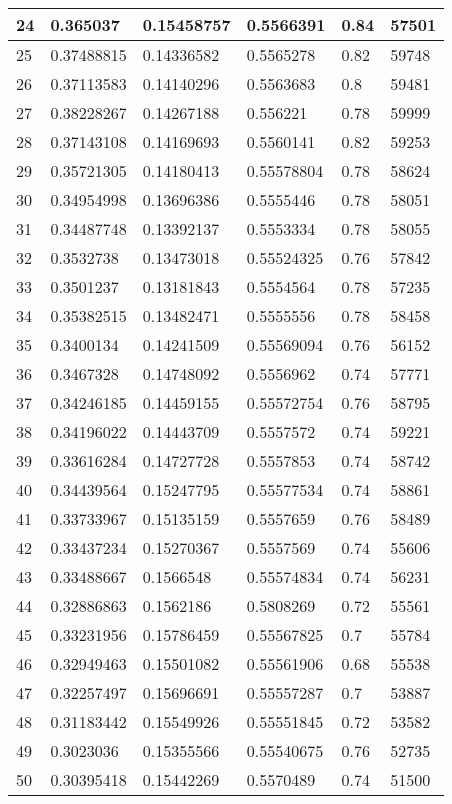 \begin{longtable}{|l|l|l|l|l|l|}
24 & 0.365037 & 0.15458757 & 0.5566391 & 0.84 & 57501 \\ \hline 
25 & 0.37488815 & 0.14336582 & 0.5565278 & 0.82 & 59748 \\ \hline 
26 & 0.37113583 & 0.14140296 & 0.5563683 & 0.8 & 59481 \\ \hline 
27 & 0.38228267 & 0.14267188 & 0.556221 & 0.78 & 59999 \\ \hline 
28 & 0.37143108 & 0.14169693 & 0.5560141 & 0.82 & 59253 \\ \hline 
29 & 0.35721305 & 0.14180413 & 0.55578804 & 0.78 & 58624 \\ \hline 
30 & 0.34954998 & 0.13696386 & 0.5555446 & 0.78 & 58051 \\ \hline 
31 & 0.34487748 & 0.13392137 & 0.5553334 & 0.78 & 58055 \\ \hline 
32 & 0.3532738 & 0.13473018 & 0.55524325 & 0.76 & 57842 \\ \hline 
33 & 0.3501237 & 0.13181843 & 0.5554564 & 0.78 & 57235 \\ \hline 
34 & 0.35382515 & 0.13482471 & 0.5555556 & 0.78 & 58458 \\ \hline 
35 & 0.3400134 & 0.14241509 & 0.55569094 & 0.76 & 56152 \\ \hline 
36 & 0.3467328 & 0.14748092 & 0.5556962 & 0.74 & 57771 \\ \hline 
37 & 0.34246185 & 0.14459155 & 0.55572754 & 0.76 & 58795 \\ \hline 
38 & 0.34196022 & 0.14443709 & 0.5557572 & 0.74 & 59221 \\ \hline 
39 & 0.33616284 & 0.14727728 & 0.5557853 & 0.74 & 58742 \\ \hline 
40 & 0.34439564 & 0.15247795 & 0.55577534 & 0.74 & 58861 \\ \hline 
41 & 0.33733967 & 0.15135159 & 0.5557659 & 0.76 & 58489 \\ \hline 
42 & 0.33437234 & 0.15270367 & 0.5557569 & 0.74 & 55606 \\ \hline 
43 & 0.33488667 & 0.1566548 & 0.55574834 & 0.74 & 56231 \\ \hline 
44 & 0.32886863 & 0.1562186 & 0.5808269 & 0.72 & 55561 \\ \hline 
45 & 0.33231956 & 0.15786459 & 0.55567825 & 0.7 & 55784 \\ \hline 
46 & 0.32949463 & 0.15501082 & 0.55561906 & 0.68 & 55538 \\ \hline 
47 & 0.32257497 & 0.15696691 & 0.55557287 & 0.7 & 53887 \\ \hline 
48 & 0.31183442 & 0.15549926 & 0.55551845 & 0.72 & 53582 \\ \hline 
49 & 0.3023036 & 0.15355566 & 0.55540675 & 0.76 & 52735 \\ \hline 
50 & 0.30395418 & 0.15442269 & 0.5570489 & 0.74 & 51500 \\ \hline 
\end{longtable}